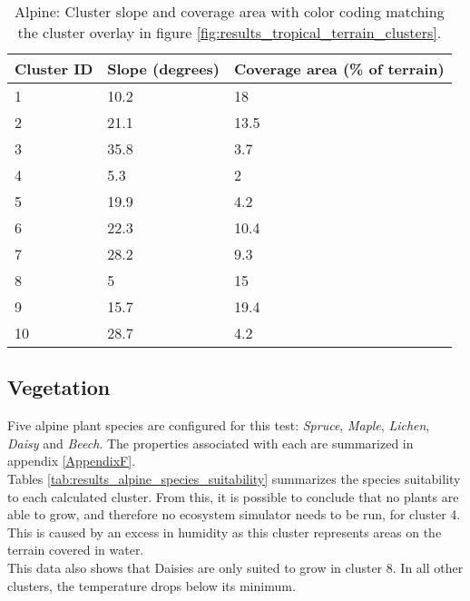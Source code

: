 \begin{table}[h]
  \centering
	    \begin{tabular}{|p{5cm}|p{5cm}|p{5cm}|}
		\hline	
  	    \textbf{Cluster ID} & \textbf{Slope (degrees)} & \textbf{Coverage area (\% of terrain)} \\
  	    \hline	
		\cellcolor{alpine_cluster_1} 1 & 10.2 & 18 \\
		\hline
		\cellcolor{alpine_cluster_2} 2 & 21.1 & 13.5 \\
		\hline
		\cellcolor{alpine_cluster_3} 3 & 35.8 & 3.7 \\
		\hline
		\cellcolor{alpine_cluster_4}4 & 5.3 & 2 \\
		\hline
		\cellcolor{alpine_cluster_5} 5 & 19.9 & 4.2 \\
		\hline
		\cellcolor{alpine_cluster_6} 6 & 22.3 & 10.4 \\
		\hline
		\cellcolor{alpine_cluster_7} 7 & 28.2 & 9.3 \\
		\hline
		\cellcolor{alpine_cluster_8} 8 & 5 & 15 \\
		\hline
		\cellcolor{alpine_cluster_9} 9 & 15.7 & 19.4 \\
		\hline
		\cellcolor{alpine_cluster_10} 10 & 28.7 & 4.2 \\
		\hline
		\end{tabular}
		\caption{Alpine: Cluster slope and coverage area with color coding matching the cluster overlay in figure \ref{fig:results_tropical_terrain_clusters}.}
	  \label{tab:results_alpine_cluster_slope_covarea}
\end{table}


\subsection{Vegetation}

Five alpine plant species are configured for this test: \textit{Spruce}, \textit{Maple}, \textit{Lichen}, \textit{Daisy} and \textit{Beech}. The properties associated with each are summarized in appendix \ref{AppendixF}.\\

Tables \ref{tab:results_alpine_species_suitability} summarizes the species suitability to each calculated cluster. From this, it is possible to conclude that no plants are able to grow, and therefore no ecosystem simulator needs to be run, for cluster 4. This is caused by an excess in humidity as this cluster represents areas on the terrain covered in water.\\ 
This data also shows that Daisies are only suited to grow in cluster 8. In all other clusters, the temperature drops below its minimum. \\

